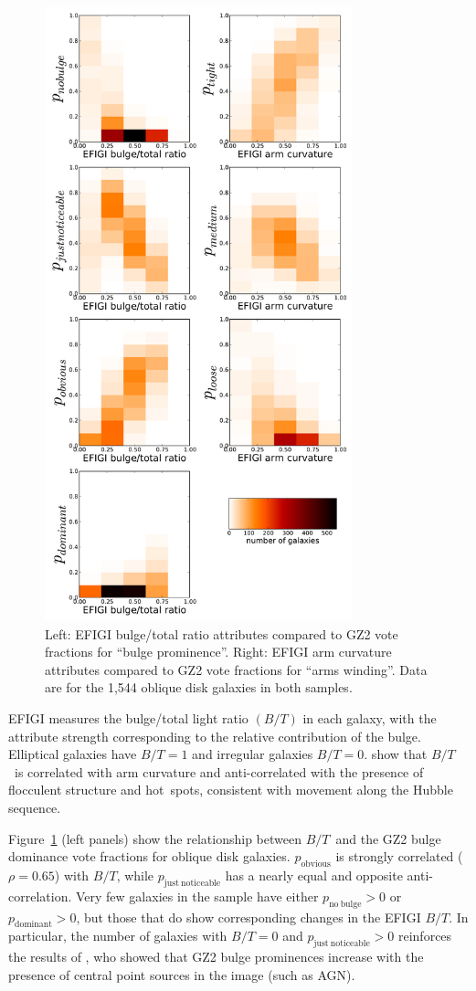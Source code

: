 \documentclass[useAMS,usenatbib]{mn2e}
\newcommand{\bt}{$B/T$}
\begin{document}
\begin{figure}
\includegraphics[angle=0,width=3.5in]{figures/efigi_bulgearms.pdf}
\caption{Left: EFIGI bulge/total ratio attributes compared to GZ2 vote fractions for ``bulge prominence''. Right: EFIGI arm curvature attributes compared to GZ2 vote fractions for ``arms winding''. Data are for the 1,544 oblique disk galaxies in both samples.  
\label{fig-efigi_bulgearms}}
\end{figure}

EFIGI measures the bulge/total light ratio $(B/T)$ in each galaxy, with the attribute strength corresponding to the relative contribution of the bulge. Elliptical galaxies have $B/T=1$ and irregular galaxies $B/T=0$. \citet{bai11} show that \bt~is correlated with arm curvature and anti-correlated with the presence of flocculent structure and hot~spots, consistent with movement along the Hubble sequence.  

Figure~\ref{fig-efigi_bulgearms} (left panels) show the relationship between \bt~and the GZ2 bulge dominance vote fractions for oblique disk galaxies. $p_\mathrm{obvious}$ is strongly correlated ($\rho=0.65$) with \bt, while $p_\mathrm{just~noticeable}$ has a nearly equal and opposite anti-correlation. Very few galaxies in the sample have either $p_\mathrm{no~bulge}>0$ or $p_\mathrm{dominant}>0$, but those that do show corresponding changes in the EFIGI \bt. In particular, the number of galaxies with $B/T=0$ and $p_\mathrm{just~noticeable}>0$ reinforces the results of \citet{sim13}, who showed that GZ2 bulge prominences increase with the presence of central point sources in the image (such as AGN). 
\end{document}
